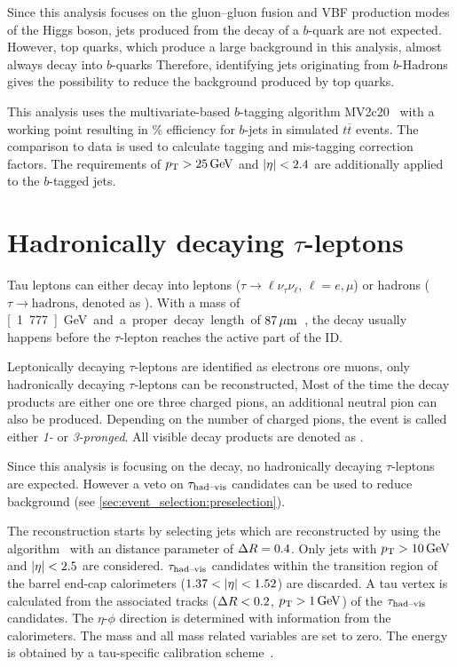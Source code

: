 Since this analysis focuses on the gluon--gluon fusion and VBF production modes of the Higgs boson, jets produced from
the decay of a $b$-quark are not expected.
However, top quarks, which produce a large background in this analysis, almost always decay into $b$-quarks
Therefore, identifying jets originating from $b$-Hadrons gives the possibility to reduce the background produced by top quarks.

This analysis uses the multivariate-based $b$-tagging algorithm MV2c20~\cite{PERF-2012-04,ATL-PHYS-PUB-2016-012} with
a working point resulting in \unit[85]{\%} efficiency for $b$-jets in simulated $t\overline{t}$ events.
The comparison to data is used to calculate tagging and mis-tagging correction factors.
The requirements of $\pt > \unit[25]{GeV}$ and $\left|\eta\right| < 2.4$ are additionally applied to the $b$-tagged jets.


\section{Hadronically decaying  $\tau$-leptons}\label{sec:object_selection:tau_leptons}

Tau leptons can either decay into leptons ($\tau \to \ell \nu_\tau \nu_\ell$, $\ell = e, \mu$) or hadrons
($\tau \to \text{hadrons}$, denoted as \tauhad{}).
With a mass of \unit[1.777]{GeV} and a proper decay length of $\unit[87]{\mu m}$~\cite{PDG}, the decay usually happens before
the $\tau$-lepton reaches the active part of the ID\@.

Leptonically decaying $\tau$-leptons are identified as electrons ore muons, only hadronically decaying $\tau$-leptons can be reconstructed,
Most of the time the decay products are either one ore three charged pions, an additional neutral pion can also be produced.
Depending on the number of charged pions, the event is called either \emph{1-} or \emph{3-pronged}.
All visible decay products are denoted as \tauhadvis{}.

Since this analysis is focusing on the \Httllfull{} decay, no hadronically decaying $\tau$-leptons are expected.
However a veto on $\tau_\text{had--vis}$ candidates can be used to reduce background (see \cref{sec:event_selection:preselection}).

The reconstruction starts by selecting jets which are reconstructed by using the \antikt{} algorithm~\cite{Cacciari:2008gp,Cacciari:2005hq}
with an distance parameter of $\Delta R = 0.4$.
Only jets with $\pt > \unit[10]{GeV}$ and $\left|\eta\right| < 2.5$ are considered.
$\tau_\text{had--vis}$ candidates within the transition region of the barrel end-cap calorimeters ($1.37 < \left|\eta\right| < 1.52$) are discarded.
A tau vertex is calculated from the associated tracks ($\Delta R < 0.2$, $\pt > \unit[1]{GeV}$) of the $\tau_\text{had--vis}$ candidates.
The $\eta$-$\phi$ direction is determined with information from the calorimeters. %
The mass and all mass related variables are set to zero.
The energy is  obtained by a tau-specific calibration scheme~\cite{Run1TauPaper}.

